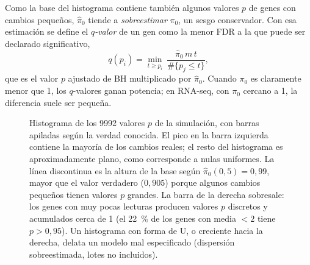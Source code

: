\begin{simbolos}
\end{simbolos}

Como la base del histograma contiene también algunos valores $p$ de genes con cambios pequeños, $\hat\pi_0$ tiende a \emph{sobreestimar} $\pi_0$, un sesgo conservador. Con esa estimación se define el \emph{$q$-valor} de un gen como la menor FDR a la que puede ser declarado significativo,
\begin{equation}\label{eq:11-qvalor}
q(p_i)=\min_{t\ge p_i}\ \frac{\hat\pi_0\,m\,t}{\#\{p_j\le t\}},
\end{equation}
que es el valor $p$ ajustado de BH multiplicado por $\hat\pi_0$. Cuando $\pi_0$ es claramente menor que 1, los $q$-valores ganan potencia; en RNA-seq, con $\pi_0$ cercano a 1, la diferencia suele ser pequeña.

\begin{figure}[!htb]
\centering

\caption[Histograma de valores $p$]{Histograma de los \num{9992} valores $p$ de la simulación, con barras apiladas según la verdad conocida. El pico en la barra izquierda contiene la mayoría de los cambios reales; el resto del histograma es aproximadamente plano, como corresponde a nulas uniformes. La línea discontinua es la altura de la base según $\hat\pi_0(0{,}5)=0{,}99$, mayor que el valor verdadero ($0{,}905$) porque algunos cambios pequeños tienen valores $p$ grandes. La barra de la derecha sobresale: los genes con muy pocas lecturas producen valores $p$ discretos y acumulados cerca de 1 (el \SI{22}{\percent} de los genes con media $<2$ tiene $p>0{,}95$). Un histograma con forma de U, o creciente hacia la derecha, delata un modelo mal especificado (dispersión sobreestimada, lotes no incluidos).}
\label{fig:11-phist}
\end{figure}

